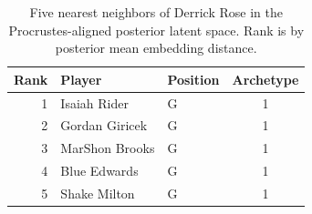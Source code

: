\begin{table}[htbp]
  \centering\small
  \begin{tabular}{rllc}
    \toprule
    Rank & Player & Position & Archetype \\
    \midrule
    1 & Isaiah Rider & G & 1 \\
    2 & Gordan Giricek & G & 1 \\
    3 & MarShon Brooks & G & 1 \\
    4 & Blue Edwards & G & 1 \\
    5 & Shake Milton & G & 1 \\
    \bottomrule
  \end{tabular}
  \caption{Five nearest neighbors of Derrick Rose in the Procrustes-aligned posterior latent space. Rank is by posterior mean embedding distance.}
  \label{tab:Derrick_Rose_neighbors}
\end{table}

